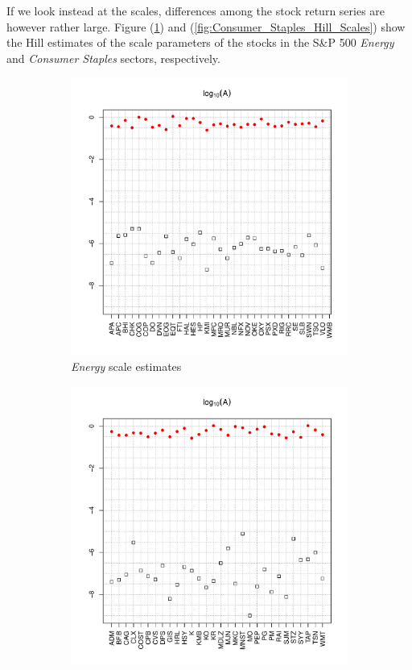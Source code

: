 \documentclass{article}
\newcommand{\1}[1]{
  \mathbf{1}_{\{#1\}}
}
\begin{document}
If we look instead at the scales, differences among the stock return
series are however rather large. Figure (\ref{fig:Energy_Hill_Scales})
and (\ref{fig:Consumer_Staples_Hill_Scales}) show the Hill estimates of
the scale parameters of the stocks in the S\&P 500 {\it Energy} and
{\it Consumer Staples} sectors, respectively.
\begin{figure}[htb!]
  \begin{subfigure}{0.45\textwidth}
    \includegraphics[width=\textwidth]{Energy_Hill_scales.pdf}
    \caption{{\it Energy} scale estimates}    
    \label{fig:Energy_Hill_Scales}
  \end{subfigure}
  \begin{subfigure}{0.45\textwidth}
    \includegraphics[width=\textwidth]{Consumer_Staples_Hill_scales.pdf}

\end{subfigure}
\end{figure}
\end{document}
